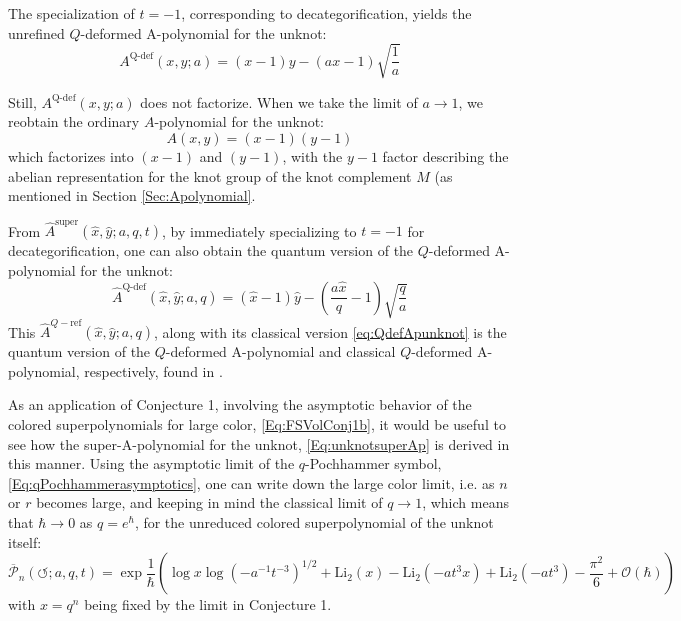 \documentclass[a4paper,titlepage,twoside]{book}
\begin{document}
The specialization of $t=-1$, corresponding to decategorification, yields the unrefined $Q$-deformed A-polynomial for the unknot:
\begin{equation}
  A^{\text{Q-def}}{ (x,y;a) } = {\left(x - 1\right)} y - {\left(a x - 1\right)} \sqrt{\frac{1}{a}}  \label{eq:QdefApunknot}
\end{equation}

Still, $A^{\text{Q-def}}{ (x,y;a)}$ does not factorize.  When we take the limit of $a\to 1$, we reobtain the ordinary $A$-polynomial for the unknot:
\begin{equation}
  A{ (x,y)} = {\left(x - 1\right)} {\left(y - 1\right)}
\end{equation}
which factorizes into $(x-1)$ and $(y-1)$, with the $y-1$ factor describing the abelian representation for the knot group of the knot complement $M$ (as mentioned in Section \ref{Sec:Apolynomial}.

From $\widehat{A}^{\text{super}}{ (\widehat{x},\widehat{y}; a,q,t)}$, by immediately specializing to $t=-1$ for decategorification, one can also obtain the quantum version of the $Q$-deformed A-polynomial for the unknot:
\begin{equation}
  \widehat{A}^{ \text{Q-def}}{ (\widehat{x}, \widehat{y}; a,q)} = {\left(\widehat{x} - 1\right)} \widehat{y} - {\left(\frac{a \widehat{x}}{q} - 1\right)} \sqrt{\frac{q}{a}}
\end{equation}
This $\widehat{A}^{Q-\text{ref}}{(\widehat{x},\widehat{y};a,q)}$, along with its classical version \eqref{eq:QdefApunknot} is the quantum version of the $Q$-deformed A-polynomial and classical $Q$-deformed A-polynomial, respectively, found in \cite{AganagicVafa2012}.  

As an application of Conjecture 1, involving the asymptotic behavior of the colored superpolynomials for large color, \eqref{Eq:FSVolConj1b}, it would be useful to see how the super-A-polynomial for the unknot, \eqref{Eq:unknotsuperAp} is derived in this manner.  Using the asymptotic limit of the $q$-Pochhammer symbol, \eqref{Eq:qPochhammerasymptotics}, one can write down the large color limit, i.e. as $n$ or $r$ becomes large, and keeping in mind the classical limit of $q\to 1$, which means that $\hbar \to 0$ as $q = e^{\hbar}$, for the unreduced colored superpolynomial of the unknot itself: 
\begin{equation}
  \overline{\mathcal{P}}_n{ (\circlearrowleft; a,q,t) } = \exp{ \frac{1}{ \hbar}{ \left( \log{x} \log{ (-a^{-1} t^{-3} )^{1/2} } + \text{Li}_2{ (x)} - \text{Li}_2{ (-at^3x) } + \text{Li}_2{ (-at^3) } - \frac{\pi^2}{6} + \mathcal{O}{ (\hbar) } \right) } }  \label{Eq:unrefinedunknotcsPasymptotics00}
\end{equation}
with $x = q^n$ being fixed by the limit in Conjecture 1.  
\end{document}
